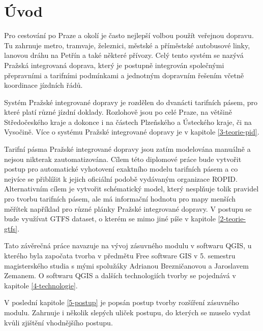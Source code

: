 \chapter*{Úvod}
\label{0-uvod}

Pro cestování po Praze a okolí je často nejlepší volbou použít veřejnou dopravu.
Tu zahrnuje metro, tramvaje, železnici, městské a příměstské autobusové linky,
lanovou dráhu na Petřín a také některé přívozy. Celý tento systém se nazývá 
Pražská integrovaná doprava, který je postupně integrován společnými přepravními
a tarifními podmínkami a jednotným dopravním řešením včetně koordinace jízdních řádů.

Systém Pražské integrované dopravy je rozdělen do dvanácti tarifních pásem, pro
které platí různé jízdní doklady. Rozlohově jsou po celé Praze, na většině
Středočeského kraje a dokonce i na částech Plzeňského a Ústeckého kraje, či na Vysočině.
Více o systému Pražské integrované dopravy je v kapitole \ref{3-teorie-pid}.

Tarifní pásma Pražské integrované dopravy jsou zatím modelována manuálně a nejsou
nikterak zautomatizována. Cílem této diplomové práce bude vytvořit postup pro
automatické vyhotovení exaktního modelu tarifních pásem a co nejvíce se přiblížit k jejich
oficiální podobě vydávaným organizace ROPID. Alternativním cílem je vytvořit schématický model, který nesplňuje tolik
pravidel pro tvorbu tarifních pásem, ale má informační hodnotu pro mapy menších měřítek
například pro různé plánky Pražské integrované dopravy. V postupu se bude využívat GTFS 
dataset, o kterém se mimo jiné píše v kapitole \ref{2-teorie-gtfs}.

Tato závěrečná práce navazuje na vývoj zásuvného modulu
v softwaru QGIS, u kterého byla započata tvorba v předmětu Free software GIS
v 5. semestru magisterského studia s mými spolužáky Adrianou Brezničanovou a Jaroslavem
Zemanem. O softwaru QGIS a dalších technologiích tvorby se pojednává v kapitole 
\ref{4-technologie}.

V poslední kapitole \ref{5-postup} je popsán postup tvorby rozšíření zásuvného modulu.
Zahrnuje i několik slepých uliček postupu, do kterých se muselo vydat kvůli zjištění
vhodnějšího postupu.    



